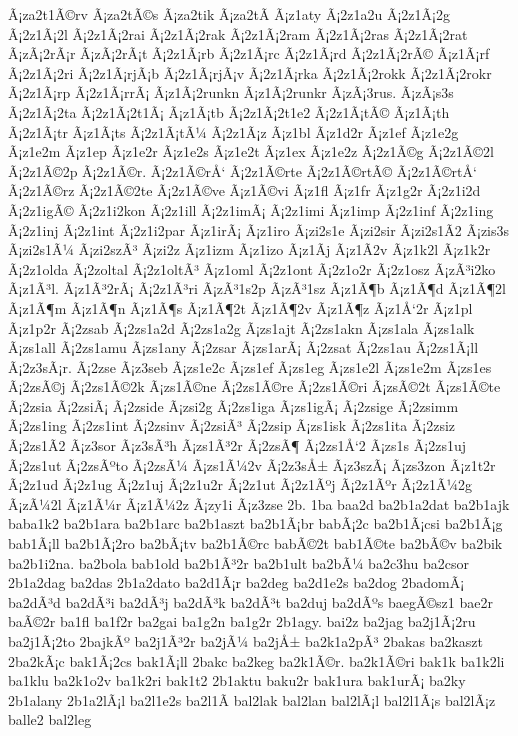 {Ã¡za2t1Ã©rv
Ã¡za2tÃ©s
Ã¡za2tik
Ã¡za2tÃ­
Ã¡z1aty
Ã¡2z1a2u
Ã¡2z1Ã¡2g
Ã¡2z1Ã¡2l
Ã¡2z1Ã¡2rai
Ã¡2z1Ã¡2rak
Ã¡2z1Ã¡2ram
Ã¡2z1Ã¡2ras
Ã¡2z1Ã¡2rat
Ã¡zÃ¡2rÃ¡r
Ã¡zÃ¡2rÃ¡t
Ã¡2z1Ã¡rb
Ã¡2z1Ã¡rc
Ã¡2z1Ã¡rd
Ã¡2z1Ã¡2rÃ©
Ã¡z1Ã¡rf
Ã¡2z1Ã¡2ri
Ã¡2z1Ã¡rjÃ¡b
Ã¡2z1Ã¡rjÃ¡v
Ã¡2z1Ã¡rka
Ã¡2z1Ã¡2rokk
Ã¡2z1Ã¡2rokr
Ã¡2z1Ã¡rp
Ã¡2z1Ã¡rrÃ¡
Ã¡z1Ã¡2runkn
Ã¡z1Ã¡2runkr
Ã¡zÃ¡3rus.
Ã¡zÃ¡s3s
Ã¡2z1Ã¡2ta
Ã¡2z1Ã¡2t1Ã¡
Ã¡z1Ã¡tb
Ã¡2z1Ã¡2t1e2
Ã¡2z1Ã¡tÃ©
Ã¡z1Ã¡th
Ã¡2z1Ã¡tr
Ã¡z1Ã¡ts
Ã¡2z1Ã¡tÃ¼
Ã¡2z1Ã¡z
Ã¡z1bl
Ã¡z1d2r
Ã¡z1ef
Ã¡z1e2g
Ã¡z1e2m
Ã¡z1ep
Ã¡z1e2r
Ã¡z1e2s
Ã¡z1e2t
Ã¡z1ex
Ã¡z1e2z
Ã¡2z1Ã©g
Ã¡2z1Ã©2l
Ã¡2z1Ã©2p
Ã¡2z1Ã©r.
Ã¡2z1Ã©rÅ‘
Ã¡2z1Ã©rte
Ã¡2z1Ã©rtÃ©
Ã¡2z1Ã©rtÅ‘
Ã¡2z1Ã©rz
Ã¡2z1Ã©2te
Ã¡2z1Ã©ve
Ã¡z1Ã©vi
Ã¡z1fl
Ã¡z1fr
Ã¡z1g2r
Ã¡2z1i2d
Ã¡2z1igÃ©
Ã¡2z1i2kon
Ã¡2z1ill
Ã¡2z1imÃ¡
Ã¡2z1imi
Ã¡z1imp
Ã¡2z1inf
Ã¡2z1ing
Ã¡2z1inj
Ã¡2z1int
Ã¡2z1i2par
Ã¡z1irÃ¡
Ã¡z1iro
Ã¡zi2s1e
Ã¡zi2sir
Ã¡zi2s1Ã­2
Ã¡zis3s
Ã¡zi2s1Ã¼
Ã¡zi2szÃ³
Ã¡zi2z
Ã¡z1izm
Ã¡z1izo
Ã¡z1Ã­j
Ã¡z1Ã­2v
Ã¡z1k2l
Ã¡z1k2r
Ã¡2z1olda
Ã¡2zoltal
Ã¡2z1oltÃ³
Ã¡z1oml
Ã¡2z1ont
Ã¡2z1o2r
Ã¡2z1osz
Ã¡zÃ³i2ko
Ã¡z1Ã³l.
Ã¡z1Ã³2rÃ¡
Ã¡2z1Ã³ri
Ã¡zÃ³1s2p
Ã¡zÃ³1sz
Ã¡z1Ã¶b
Ã¡z1Ã¶d
Ã¡z1Ã¶2l
Ã¡z1Ã¶m
Ã¡z1Ã¶n
Ã¡z1Ã¶s
Ã¡z1Ã¶2t
Ã¡z1Ã¶2v
Ã¡z1Ã¶z
Ã¡z1Å‘2r
Ã¡z1pl
Ã¡z1p2r
Ã¡2zsab
Ã¡2zs1a2d
Ã¡2zs1a2g
Ã¡zs1ajt
Ã¡2zs1akn
Ã¡zs1ala
Ã¡zs1alk
Ã¡zs1all
Ã¡2zs1amu
Ã¡zs1any
Ã¡2zsar
Ã¡zs1arÃ¡
Ã¡2zsat
Ã¡2zs1au
Ã¡2zs1Ã¡ll
Ã¡2z3sÃ¡r.
Ã¡2zse
Ã¡z3seb
Ã¡zs1e2c
Ã¡zs1ef
Ã¡zs1eg
Ã¡zs1e2l
Ã¡zs1e2m
Ã¡zs1es
Ã¡2zsÃ©j
Ã¡2zs1Ã©2k
Ã¡zs1Ã©ne
Ã¡2zs1Ã©re
Ã¡2zs1Ã©ri
Ã¡zsÃ©2t
Ã¡zs1Ã©te
Ã¡2zsia
Ã¡2zsiÃ¡
Ã¡2zside
Ã¡zsi2g
Ã¡2zs1iga
Ã¡zs1igÃ¡
Ã¡2zsige
Ã¡2zsimm
Ã¡2zs1ing
Ã¡2zs1int
Ã¡2zsinv
Ã¡2zsiÃ³
Ã¡2zsip
Ã¡zs1isk
Ã¡2zs1ita
Ã¡2zsiz
Ã¡2zs1Ã­2
Ã¡z3sor
Ã¡z3sÃ³h
Ã¡zs1Ã³2r
Ã¡2zsÃ¶
Ã¡2zs1Å‘2
Ã¡zs1s
Ã¡2zs1uj
Ã¡2zs1ut
Ã¡2zsÃºto
Ã¡2zsÃ¼
Ã¡zs1Ã¼2v
Ã¡2z3sÅ±
Ã¡z3szÃ¡
Ã¡zs3zon
Ã¡z1t2r
Ã¡2z1ud
Ã¡2z1ug
Ã¡2z1uj
Ã¡2z1u2r
Ã¡2z1ut
Ã¡2z1Ãºj
Ã¡2z1Ãºr
Ã¡2z1Ã¼2g
Ã¡zÃ¼2l
Ã¡z1Ã¼r
Ã¡z1Ã¼2z
Ã¡zy1i
Ã¡z3zse
2b.
1ba
baa2d
ba2b1a2dat
ba2b1ajk
baba1k2
ba2b1ara
ba2b1arc
ba2b1aszt
ba2b1Ã¡br
babÃ¡2c
ba2b1Ã¡csi
ba2b1Ã¡g
bab1Ã¡ll
ba2b1Ã¡2ro
ba2bÃ¡tv
ba2b1Ã©rc
babÃ©2t
bab1Ã©te
ba2bÃ©v
ba2bik
ba2b1i2na.
ba2bola
bab1old
ba2b1Ã³2r
ba2b1ult
ba2bÃ¼
ba2c3hu
ba2csor
2b1a2dag
ba2das
2b1a2dato
ba2d1Ã¡r
ba2deg
ba2d1e2s
ba2dog
2badomÃ¡
ba2dÃ³d
ba2dÃ³i
ba2dÃ³j
ba2dÃ³k
ba2dÃ³t
ba2duj
ba2dÃºs
baegÃ©sz1
bae2r
baÃ©2r
ba1fl
ba1f2r
ba2gai
ba1g2n
ba1g2r
2b1agy.
bai2z
ba2jag
ba2j1Ã¡2ru
ba2j1Ã¡2to
2bajkÃº
ba2j1Ã³2r
ba2jÃ¼
ba2jÅ±
ba2k1a2pÃ³
2bakas
ba2kaszt
2ba2kÃ¡c
bak1Ã¡2cs
bak1Ã¡ll
2bakc
ba2keg
ba2k1Ã©r.
ba2k1Ã©ri
bak1k
ba1k2li
ba1klu
ba2k1o2v
ba1k2ri
bak1t2
2b1aktu
baku2r
bak1ura
bak1urÃ¡
ba2ky
2b1alany
2b1a2lÃ¡l
ba2l1e2s
ba2l1Ã­
bal2lak
bal2lan
bal2lÃ¡l
bal2l1Ã¡s
bal2lÃ¡z
balle2
bal2leg
}

